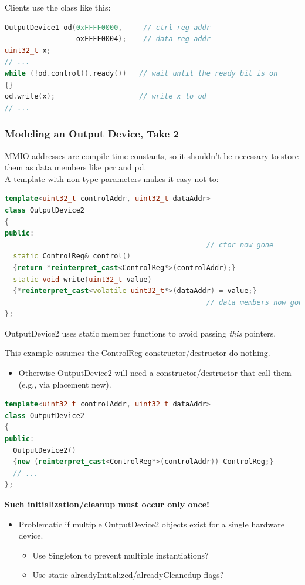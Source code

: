 Clients use the class like this:
\begin{lstlisting}[language=C++]
OutputDevice1 od(0xFFFF0000,     // ctrl reg addr
                 oxFFFF0004);    // data reg addr
uint32_t x;
// ...
while (!od.control().ready())   // wait until the ready bit is on
{}
od.write(x);                    // write x to od
// ...
\end{lstlisting}

\subsubsection{Modeling an Output Device, Take 2}
MMIO addresses are compile-time constants, so it shouldn't be necessary to store them as data members like pcr and pd.\\
A template with non-type parameters makes it easy not to:
\begin{lstlisting}[language=C++]
template<uint32_t controlAddr, uint32_t dataAddr>
class OutputDevice2
{
public:
                                                // ctor now gone
  static ControlReg& control()
  {return *reinterpret_cast<ControlReg*>(controlAddr);}
  static void write(uint32_t value)
  {*reinterpret_cast<volatile uint32_t*>(dataAddr) = value;}
                                                // data members now gone
};
\end{lstlisting}
OutputDevice2 uses static member functions to avoid passing \textit{this} pointers.

This example assumes the ControlReg constructor/destructor do nothing.
\begin{itemize}
  \item Otherwise OutputDevice2 will need a constructor/destructor that call them (e.g., via placement new).
\end{itemize}
\begin{lstlisting}[language=C++]
template<uint32_t controlAddr, uint32_t dataAddr>
class OutputDevice2
{
public:
  OutputDevice2()
  {new (reinterpret_cast<ControlReg*>(controlAddr)) ControlReg;}
  // ...
};
\end{lstlisting}
\textbf{Such initialization/cleanup must occur only once!}
\begin{itemize}
  \item Problematic if multiple OutputDevice2 objects exist for a single hardware device.
  \begin{itemize}
    \item Use Singleton to prevent multiple instantiations?
    \item Use static alreadyInitialized/alreadyCleanedup flags?
  \end{itemize}
\end{itemize}


